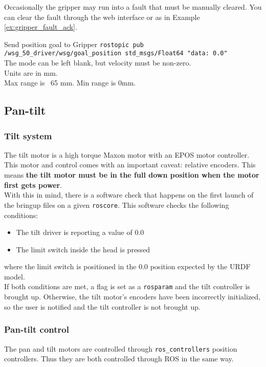 Occasionally the gripper may run into a fault that must be manually cleared. 
You can clear the fault through the web interface or as in Example \ref{ex:gripper_fault_ack}.

\begin{example}{Send position goal to Gripper}
  \label{ex:gripper_pos_goal}
    \texttt{rostopic pub /wsg\_50\_driver/wsg/goal\_position std\_msgs/Float64 "data: 0.0"} \\
    
    The mode can be left blank, but velocity must be non-zero. \\
    Units are in mm. \\
    Max range is ~65 mm. Min range is 0mm.
\end{example}


\subsection{Pan-tilt}
\subsubsection{Tilt system}
The tilt motor is a high torque Maxon motor with an EPOS motor controller. 
This motor and control comes with an important caveat: relative encoders. 
This means \textbf{the tilt motor must be in the full down position when the motor first gets power}. \\

With this in mind, there is a software check that happens on the first launch of the bringup files on a given \texttt{roscore}. 
This software checks the following conditions:
\begin{itemize}
  \item The tilt driver is reporting a value of 0.0
  \item The limit switch inside the head is pressed
\end{itemize}

where the limit switch is positioned in the 0.0 position expected by the URDF model. \\

If both conditions are met, a flag is set as a \texttt{rosparam} and the tilt controller is brought up. 
Otherwise, the tilt motor's encoders have been incorrectly initialized, so the user is notified and the tilt controller is not brought up. \\


\subsubsection{Pan-tilt control}
The pan and tilt motors are controlled through \texttt{ros\_controllers} position controllers. 
Thus they are both controlled through ROS in the same way.

